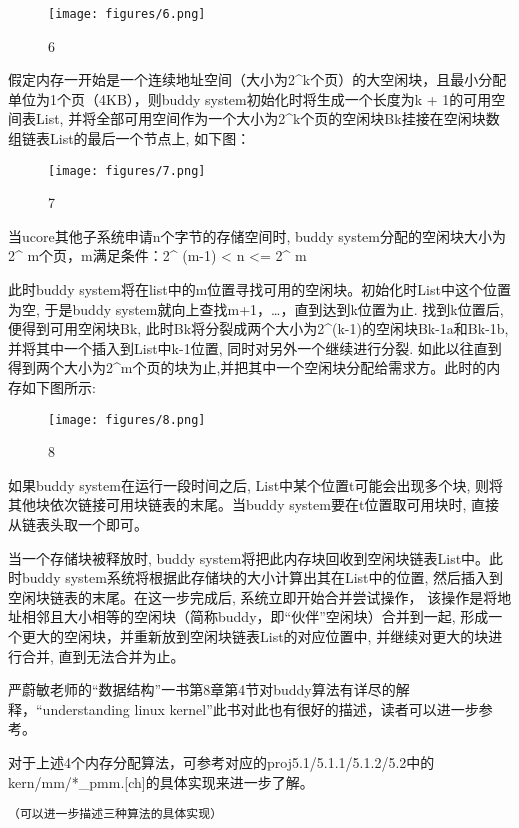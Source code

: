 \begin{figure}[htbp]
\centering
\texttt{[image: figures/6.png]}
\caption{6}
\end{figure}

假定内存一开始是一个连续地址空间（大小为2\^{}k个页）的大空闲块，且最小分配单位为1个页（4KB），则buddy
system初始化时将生成一个长度为k + 1的可用空间表List,
并将全部可用空间作为一个大小为2\^{}k个页的空闲块Bk挂接在空闲块数组链表List的最后一个节点上,
如下图：

\begin{figure}[htbp]
\centering
\texttt{[image: figures/7.png]}
\caption{7}
\end{figure}

当ucore其他子系统申请n个字节的存储空间时, buddy
system分配的空闲块大小为2\^{} m个页，m满足条件：2\^{} (m-1) \textless{}
n \textless{}= 2\^{} m

此时buddy
system将在list中的m位置寻找可用的空闲块。初始化时List中这个位置为空,
于是buddy system就向上查找m+1，\ldots{}，直到达到k位置为止. 找到k位置后,
便得到可用空闲块Bk,
此时Bk将分裂成两个大小为2\^{}(k-1)的空闲块Bk-1a和Bk-1b,
并将其中一个插入到List中k-1位置, 同时对另外一个继续进行分裂.
如此以往直到得到两个大小为2\^{}m个页的块为止,并把其中一个空闲块分配给需求方。此时的内存如下图所示:

\begin{figure}[htbp]
\centering
\texttt{[image: figures/8.png]}
\caption{8}
\end{figure}

如果buddy system在运行一段时间之后, List中某个位置t可能会出现多个块,
则将其他块依次链接可用块链表的末尾。当buddy system要在t位置取可用块时,
直接从链表头取一个即可。

当一个存储块被释放时, buddy
system将把此内存块回收到空闲块链表List中。此时buddy
system系统将根据此存储块的大小计算出其在List中的位置,
然后插入到空闲块链表的末尾。在这一步完成后, 系统立即开始合并尝试操作，
该操作是将地址相邻且大小相等的空闲块（简称buddy，即``伙伴''空闲块）合并到一起,
形成一个更大的空闲块，并重新放到空闲块链表List的对应位置中,
并继续对更大的块进行合并, 直到无法合并为止。

严蔚敏老师的``数据结构''一书第8章第4节对buddy算法有详尽的解释，``understanding
linux kernel''此书对此也有很好的描述，读者可以进一步参考。

对于上述4个内存分配算法，可参考对应的proj5.1/5.1.1/5.1.2/5.2中的kern/mm/*\_pmm.{[}ch{]}的具体实现来进一步了解。

\lstinline!（可以进一步描述三种算法的具体实现）!
